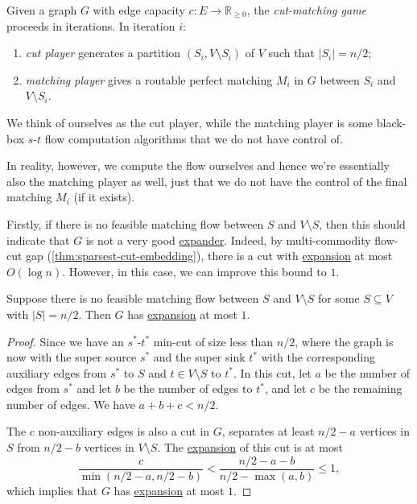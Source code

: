 \begin{definition}\label{def:cut-matching-game}
	Given a graph \(G\) with edge capacity \(c\colon E \to \mathbb{R} _{\geq 0}\), the \emph{cut-matching game} proceeds in iterations. In iteration \(i\):
	\begin{enumerate}
		\item \emph{cut player} generates a partition \((S_i, V\setminus S_i)\) of \(V\) such that \(\lvert S_i \rvert = n / 2\);
		\item \emph{matching player} gives a routable perfect matching \(M_i\) in \(G\) between \(S_i\) and \(V \setminus S_i\).
	\end{enumerate}
\end{definition}

We think of ourselves as the cut player, while the matching player is some black-box \(s\)-\(t\) flow computation algorithms that we do not have control of.

\begin{intuition}
	In reality, however, we compute the flow ourselves and hence we're essentially also the matching player as well, just that we do not have the control of the final matching \(M_i\) (if it exists).
\end{intuition}

Firstly, if there is no feasible matching flow between \(S\) and \(V\setminus S\), then this should indicate that \(G\) is not a very good \hyperref[def:expander]{expander}. Indeed, by multi-commodity flow-cut gap (\autoref{thm:sparsest-cut-embedding}), there is a cut with \hyperref[def:expansion]{expansion} at most \(O(\log n)\). However, in this case, we can improve this bound to \(1\).

\begin{lemma}\label{lma:cut-matching-fail}
	Suppose there is no feasible matching flow between \(S\) and \(V\setminus S\) for some \(S \subseteq V\) with \(\lvert S \rvert = n / 2\). Then \(G\) has \hyperref[def:expansion]{expansion} at most \(1\).
\end{lemma}
\begin{proof}
	Since we have an \(s^{\ast}\)-\(t^{\ast} \) min-cut of size less than \(n / 2\), where the graph is now with the super source \(s^{\ast} \) and the super sink \(t^{\ast} \) with the corresponding auxiliary edges from \(s^{\ast} \) to \(S\) and \(t \in V\setminus S\) to \(t^{\ast} \). In this cut, let \(a\) be the number of edges from \(s^{\ast} \) and let \(b\) be the number of edges to \(t^{\ast} \), and let \(c\) be the remaining number of edges. We have \(a + b + c < n / 2\).

	The \(c\) non-auxiliary edges is also a cut in \(G\), separates at least \(n / 2 - a\) vertices in \(S\) from \(n / 2 - b\) vertices in \(V\setminus S\). The \hyperref[def:expansion]{expansion} of this cut is at most
	\[
		\frac{c}{\min (n / 2 - a, n / 2 - b)}
		< \frac{n / 2 - a - b}{n / 2 - \max (a, b)}
		\leq 1,
	\]
	which implies that \(G\) has \hyperref[def:expansion]{expansion} at most \(1\).
\end{proof}

